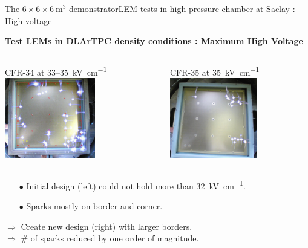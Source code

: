 \documentclass[10pt]{beamer}
\begin{document}
    \begin{frame}{The \texorpdfstring{$6 \times 6 \times \SI{6}{\meter\cubed}$}{666} demonstrator}{LEM tests in high pressure chamber at Saclay : High voltage}
    	\begin{scriptsize}
    		\begin{center}\textbf{Test LEMs in DLArTPC density conditions : Maximum High Voltage}\end{center}
    		\begin{columns}
	    		\begin{column}{0.48\textwidth}
	    			\centering CFR-34 at 33--\SI{35}{\kilo\volt\per\centi\meter}
	    			\includegraphics[height=3.5cm]{figures/666/sparks_34.png}
	    		\end{column}\hfill
	    		\begin{column}{0.48\textwidth}
	    			\centering CFR-35 at \SI{35}{\kilo\volt\per\centi\meter}
	    			\centering \includegraphics[height=3.5cm]{figures/666/sparks_35.png}
	    		\end{column}
	    	\end{columns}\vfill
	    	\begin{columns}
	    		\begin{column}{0.48\textwidth}
	    			\begin{itemize}
	    				\item[$\bullet$] Initial design (left) could not hold more than \SI{32}{\kilo\volt\per\centi\meter}.
	    				\item[$\bullet$] Sparks mostly on border and corner.
	    			\end{itemize}
	    			$\Rightarrow$ Create new design (right) with larger borders.\\
	    			$\Rightarrow$ \# of sparks reduced by one order of magnitude.
	    		\end{column}\hfill

\end{columns}
\end{scriptsize}
\end{frame}
\end{document}
